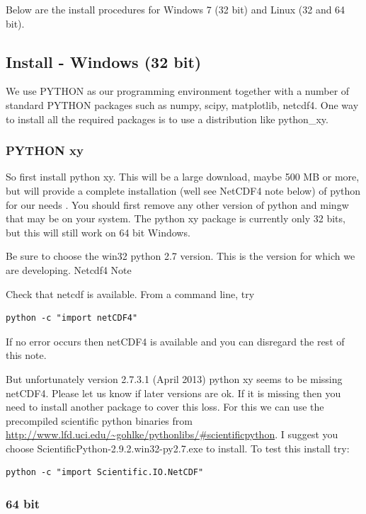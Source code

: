 \documentclass{manual}
\begin{document}
Below are the install procedures for Windows 7 (32 bit) and Linux (32 and 64 bit).

\subsection{Install - Windows (32 bit)}
\label{sec:win}



We use PYTHON as our programming environment together with a number of standard PYTHON packages such as numpy, scipy, matplotlib, netcdf4. One way to install all the required packages is to use a distribution like python_xy.

\subsubsection{PYTHON xy}

So first install  python xy. This will be a large download, maybe 500 MB or more, but will provide a complete installation (well see NetCDF4 note below) of python for our needs . You should first remove any other version of python and mingw that may be on your system. The python xy package is currently only 32 bits, but this will still work on 64 bit Windows.

Be sure to choose the win32 python 2.7 version. This is the version for which we are developing.
Netcdf4 Note

Check that netcdf is available. From a command line, try
\begin{verbatim}
python -c "import netCDF4"
\end{verbatim}
If no error occurs then netCDF4 is available and you can disregard the rest of this note.

But unfortunately version 2.7.3.1 (April 2013) python xy seems to be missing netCDF4. Please let us know if later versions are ok.
If it is missing then you need to install another package to cover this loss. For this we can use the precompiled scientific python binaries from  \url{http://www.lfd.uci.edu/~gohlke/pythonlibs/#scientificpython}. I suggest you choose ScientificPython-2.9.2.win32-py2.7.‌exe to install. To test this install try:
\begin{verbatim}
python -c "import Scientific.IO.NetCDF"
\end{verbatim}

\subsubsection{64 bit}
\end{document}
